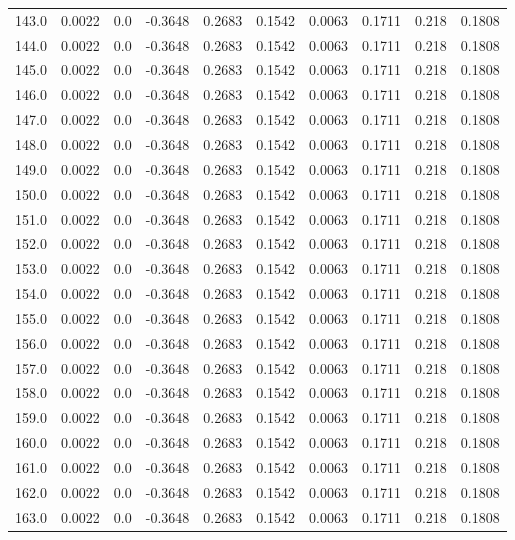 \begin{longtable}{lrrrrrrrrr}
143.0 & 0.0022 & 0.0 & -0.3648 & 0.2683 & 0.1542 & 0.0063 & 0.1711 & 0.218 & 0.1808 \\
144.0 & 0.0022 & 0.0 & -0.3648 & 0.2683 & 0.1542 & 0.0063 & 0.1711 & 0.218 & 0.1808 \\
145.0 & 0.0022 & 0.0 & -0.3648 & 0.2683 & 0.1542 & 0.0063 & 0.1711 & 0.218 & 0.1808 \\
146.0 & 0.0022 & 0.0 & -0.3648 & 0.2683 & 0.1542 & 0.0063 & 0.1711 & 0.218 & 0.1808 \\
147.0 & 0.0022 & 0.0 & -0.3648 & 0.2683 & 0.1542 & 0.0063 & 0.1711 & 0.218 & 0.1808 \\
148.0 & 0.0022 & 0.0 & -0.3648 & 0.2683 & 0.1542 & 0.0063 & 0.1711 & 0.218 & 0.1808 \\
149.0 & 0.0022 & 0.0 & -0.3648 & 0.2683 & 0.1542 & 0.0063 & 0.1711 & 0.218 & 0.1808 \\
150.0 & 0.0022 & 0.0 & -0.3648 & 0.2683 & 0.1542 & 0.0063 & 0.1711 & 0.218 & 0.1808 \\
151.0 & 0.0022 & 0.0 & -0.3648 & 0.2683 & 0.1542 & 0.0063 & 0.1711 & 0.218 & 0.1808 \\
152.0 & 0.0022 & 0.0 & -0.3648 & 0.2683 & 0.1542 & 0.0063 & 0.1711 & 0.218 & 0.1808 \\
153.0 & 0.0022 & 0.0 & -0.3648 & 0.2683 & 0.1542 & 0.0063 & 0.1711 & 0.218 & 0.1808 \\
154.0 & 0.0022 & 0.0 & -0.3648 & 0.2683 & 0.1542 & 0.0063 & 0.1711 & 0.218 & 0.1808 \\
155.0 & 0.0022 & 0.0 & -0.3648 & 0.2683 & 0.1542 & 0.0063 & 0.1711 & 0.218 & 0.1808 \\
156.0 & 0.0022 & 0.0 & -0.3648 & 0.2683 & 0.1542 & 0.0063 & 0.1711 & 0.218 & 0.1808 \\
157.0 & 0.0022 & 0.0 & -0.3648 & 0.2683 & 0.1542 & 0.0063 & 0.1711 & 0.218 & 0.1808 \\
158.0 & 0.0022 & 0.0 & -0.3648 & 0.2683 & 0.1542 & 0.0063 & 0.1711 & 0.218 & 0.1808 \\
159.0 & 0.0022 & 0.0 & -0.3648 & 0.2683 & 0.1542 & 0.0063 & 0.1711 & 0.218 & 0.1808 \\
160.0 & 0.0022 & 0.0 & -0.3648 & 0.2683 & 0.1542 & 0.0063 & 0.1711 & 0.218 & 0.1808 \\
161.0 & 0.0022 & 0.0 & -0.3648 & 0.2683 & 0.1542 & 0.0063 & 0.1711 & 0.218 & 0.1808 \\
162.0 & 0.0022 & 0.0 & -0.3648 & 0.2683 & 0.1542 & 0.0063 & 0.1711 & 0.218 & 0.1808 \\
163.0 & 0.0022 & 0.0 & -0.3648 & 0.2683 & 0.1542 & 0.0063 & 0.1711 & 0.218 & 0.1808 \\

\end{longtable}
